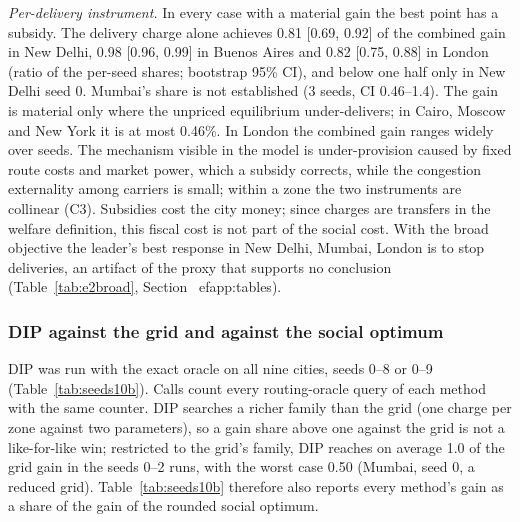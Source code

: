 \documentclass[preprint,11pt]{elsarticle}
\theoremstyle{definition}
\theoremstyle{remark}
\begin{document}
\emph{Per-delivery instrument.} In every case with a material gain the best point has a subsidy. The delivery charge alone achieves 0.81 [0.69, 0.92] of the combined gain in New Delhi, 0.98 [0.96, 0.99] in Buenos Aires and 0.82 [0.75, 0.88] in London (ratio of the per-seed shares; bootstrap 95\% CI), and below one half only in New Delhi seed 0. Mumbai's share is not established (3 seeds, CI 0.46--1.4). The gain is material only where the unpriced equilibrium under-delivers; in Cairo, Moscow and New York it is at most 0.46\%. In London the combined gain ranges widely over seeds. The mechanism visible in the model is under-provision caused by fixed route costs and market power, which a subsidy corrects, while the congestion externality among carriers is small; within a zone the two instruments are collinear (C3). Subsidies cost the city money; since charges are transfers in the welfare definition, this fiscal cost is not part of the social cost. With the broad objective the leader's best response in New Delhi, Mumbai, London is to stop deliveries, an artifact of the proxy that supports no conclusion (Table~\ref{tab:e2broad}, Section~
ef{app:tables}).

\subsubsection{DIP against the grid and against the social optimum}\label{sec:res-dip}

DIP was run with the exact oracle on all nine cities, seeds 0--8 or 0--9 (Table~\ref{tab:seeds10b}). Calls count every routing-oracle query of each method with the same counter. DIP searches a richer family than the grid (one charge per zone against two parameters), so a gain share above one against the grid is not a like-for-like win; restricted to the grid's family, DIP reaches on average 1.0 of the grid gain in the seeds 0--2 runs, with the worst case 0.50 (Mumbai, seed 0, a reduced grid). Table~\ref{tab:seeds10b} therefore also reports every method's gain as a share of the gain of the rounded social optimum.
\end{document}
